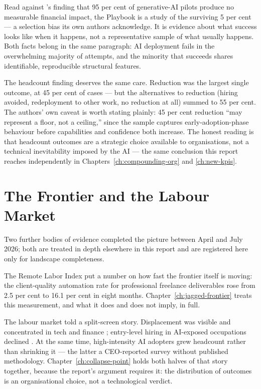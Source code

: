 Read against \textcite{MITNANDA2025}'s finding that 95 per cent of generative-AI pilots produce no measurable financial impact, the Playbook is a study of the surviving 5 per cent --- a selection bias its own authors acknowledge. It is evidence about what success looks like when it happens, not a representative sample of what usually happens. Both facts belong in the same paragraph: AI deployment fails in the overwhelming majority of attempts, and the minority that succeeds shares identifiable, reproducible structural features.

The headcount finding deserves the same care. Reduction was the largest single outcome, at 45 per cent of cases --- but the alternatives to reduction (hiring avoided, redeployment to other work, no reduction at all) summed to 55 per cent. The authors' own caveat is worth stating plainly: 45 per cent reduction ``may represent a floor, not a ceiling,'' since the sample captures early-adoption-phase behaviour before capabilities and confidence both increase. The honest reading is that headcount outcomes are a strategic choice available to organisations, not a technical inevitability imposed by the AI --- the same conclusion this report reaches independently in Chapters~\ref{ch:compounding-org} and \ref{ch:new-kpis}.

\section{The Frontier and the Labour Market}

Two further bodies of evidence completed the picture between April and July 2026; both are treated in depth elsewhere in this report and are registered here only for landscape completeness.

The Remote Labor Index \parencite{CAIS2026RLI, RLI2025} put a number on how fast the frontier itself is moving: the client-quality automation rate for professional freelance deliverables rose from 2.5 per cent to 16.1 per cent in eight months. Chapter~\ref{ch:jagged-frontier} treats this measurement, and what it does and does not imply, in full.

The labour market told a split-screen story. Displacement was visible and concentrated in tech and finance \parencite{Challenger2026}; entry-level hiring in AI-exposed occupations declined \parencite{Brynjolfsson2025Canaries}. At the same time, high-intensity AI adopters grew headcount rather than shrinking it \parencite{RampRevelio2026, Levie2026} --- the latter a CEO-reported survey without published methodology. Chapter~\ref{ch:collapse-point} holds both halves of that story together, because the report's argument requires it: the distribution of outcomes is an organisational choice, not a technological verdict.

